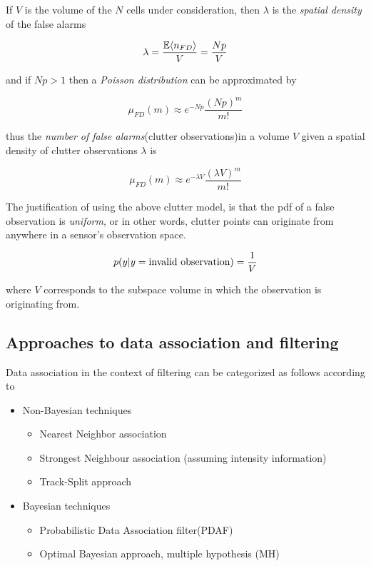 If $V$ is the volume of the $N$ cells under consideration, then $\lambda$ is the \emph{spatial density }of the false alarms


$$
\lambda = \frac{ {\operatorname*{\mathbb{E}}\langle{n_{FD}}\rangle}}{V} = \frac{N p}{V}
$$


and if $Np >1$ then a \emph{Poisson distribution} can be approximated by 

\begin{equation}\label{eq:poisson}
\mu_{FD}(m) \approx e^{-Np}\frac{(Np)^m}{m!}
\end{equation}


thus the \emph{number of false alarms}(clutter observations)in a volume $V$ given a spatial density of clutter observations $\lambda$ is

$$
\mu_{FD}(m) \approx e^{-\lambda V}\frac{(\lambda V)^m}{m!}
$$

The justification of using the above clutter model, is that the pdf of a false observation  is \emph{uniform}, or in other words, clutter points can originate from anywhere in a sensor's observation space.


$$
p({y}|{{y} = \text{invalid observation}}) = \frac{1}{V}
$$


where $V$ corresponds to the subspace volume in which the observation is originating from.

\subsection{Approaches to data association and filtering}

Data association in the context of filtering can be categorized as follows according to \cite{Shalom1995}

\begin{itemize}
	\item Non-Bayesian techniques
	\begin{itemize}
		\item Nearest Neighbor association
		\item Strongest Neighbour association (assuming intensity information)
		\item Track-Split approach
	\end{itemize}
	
	\item Bayesian techniques
	\begin{itemize}
		\item Probabilistic Data Association filter(PDAF)
		\item Optimal Bayesian approach, multiple hypothesis (MH)
	\end{itemize}

\end{itemize}
